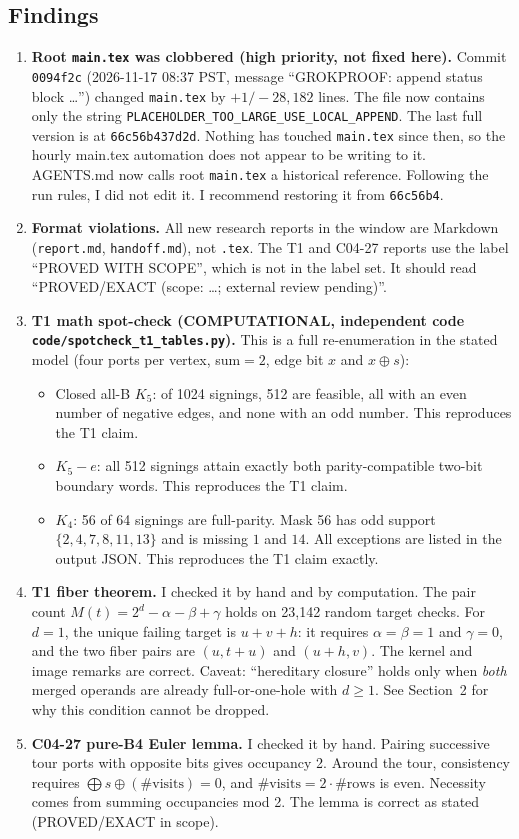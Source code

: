 \documentclass[11pt]{article}
\begin{document}
\subsection*{Findings}
\begin{enumerate}
\item \textbf{Root \texttt{main.tex} was clobbered (high priority, not fixed here).} Commit \texttt{0094f2c} (2026-11-17 08:37 PST, message ``GROKPROOF: append status block \ldots'') changed \texttt{main.tex} by $+1/-28{,}182$ lines. The file now contains only the string \texttt{PLACEHOLDER\_TOO\_LARGE\_USE\_LOCAL\_APPEND}. The last full version is at \texttt{66c56b437d2d}. Nothing has touched \texttt{main.tex} since then, so the hourly main.tex automation does not appear to be writing to it. AGENTS.md now calls root \texttt{main.tex} a historical reference. Following the run rules, I did not edit it. I recommend restoring it from \texttt{66c56b4}.
\item \textbf{Format violations.} All new research reports in the window are Markdown (\texttt{report.md}, \texttt{handoff.md}), not \texttt{.tex}. The T1 and C04-27 reports use the label ``PROVED WITH SCOPE'', which is not in the label set. It should read ``PROVED/EXACT (scope: \ldots; external review pending)''.
\item \textbf{T1 math spot-check (COMPUTATIONAL, independent code \texttt{code/spotcheck\_t1\_tables.py}).} This is a full re-enumeration in the stated model (four ports per vertex, sum$=2$, edge bit $x$ and $x\oplus s$):
 \begin{itemize}
 \item[] Closed all-B $K_5$: of 1024 signings, 512 are feasible, all with an even number of negative edges, and none with an odd number. This reproduces the T1 claim.
 \item[] $K_5-e$: all 512 signings attain exactly both parity-compatible two-bit boundary words. This reproduces the T1 claim.
 \item[] $K_4$: 56 of 64 signings are full-parity. Mask 56 has odd support $\{2,4,7,8,11,13\}$ and is missing $1$ and $14$. All exceptions are listed in the output JSON. This reproduces the T1 claim exactly.
 \end{itemize}
\item \textbf{T1 fiber theorem.} I checked it by hand and by computation. The pair count $M(t)=2^d-\alpha-\beta+\gamma$ holds on 23{,}142 random target checks. For $d=1$, the unique failing target is $u+v+h$: it requires $\alpha=\beta=1$ and $\gamma=0$, and the two fiber pairs are $(u,t+u)$ and $(u+h,v)$. The kernel and image remarks are correct. Caveat: ``hereditary closure'' holds only when \emph{both} merged operands are already full-or-one-hole with $d\ge1$. See Section~2 for why this condition cannot be dropped.
\item \textbf{C04-27 pure-B4 Euler lemma.} I checked it by hand. Pairing successive tour ports with opposite bits gives occupancy 2. Around the tour, consistency requires $\bigoplus s\oplus(\#\text{visits})=0$, and $\#\text{visits}=2\cdot\#\text{rows}$ is even. Necessity comes from summing occupancies mod 2. The lemma is correct as stated (PROVED/EXACT in scope).
\end{enumerate}
\end{document}
